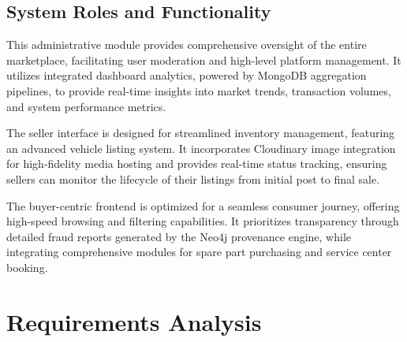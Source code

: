 \documentclass[12pt,a4paper]{report}
\begin{document}
\section{System Roles and Functionality}

\begin{description}[leftmargin=0em, itemsep=1.5em]

    \item[Admin Panel:] This administrative module provides comprehensive oversight of the entire marketplace, facilitating user moderation and high-level platform management. It utilizes integrated dashboard analytics, powered by MongoDB aggregation pipelines, to provide real-time insights into market trends, transaction volumes, and system performance metrics.

    \item[Seller Dashboard:] The seller interface is designed for streamlined inventory management, featuring an advanced vehicle listing system. It incorporates Cloudinary image integration for high-fidelity media hosting and provides real-time status tracking, ensuring sellers can monitor the lifecycle of their listings from initial post to final sale.

    \item[Buyer Experience:] The buyer-centric frontend is optimized for a seamless consumer journey, offering high-speed browsing and filtering capabilities. It prioritizes transparency through detailed fraud reports generated by the Neo4j provenance engine, while integrating comprehensive modules for spare part purchasing and service center booking.

\end{description}

\chapter{Requirements Analysis}
\end{document}
